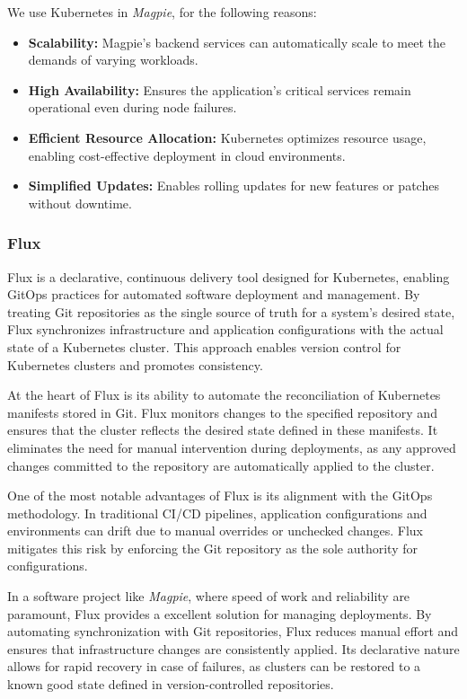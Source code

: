 \documentclass[preview]{standalone}
\begin{document}
We use Kubernetes in \textit{Magpie}, for the following reasons:
\begin{itemize}
    \item \textbf{Scalability:} Magpie's backend services can automatically
    scale to meet the demands of varying workloads.
    \item \textbf{High Availability:} Ensures the application's critical
    services remain operational even during node failures.
    \item \textbf{Efficient Resource Allocation:} Kubernetes optimizes resource
    usage, enabling cost-effective deployment in cloud environments.
    \item \textbf{Simplified Updates:} Enables rolling updates for new features
    or patches without downtime.
\end{itemize}

\subsubsection{Flux}

Flux is a declarative, continuous delivery tool designed for Kubernetes,
enabling GitOps practices for automated software deployment and management. By
treating Git repositories as the single source of truth for a system's desired
state, Flux synchronizes infrastructure and application configurations with the
actual state of a Kubernetes cluster. This approach enables version control
for Kubernetes clusters and promotes consistency.

At the heart of Flux is its ability to automate the reconciliation of Kubernetes
manifests stored in Git. Flux monitors changes to the specified repository and
ensures that the cluster reflects the desired state defined in these manifests.
It eliminates the need for manual intervention during deployments, as any
approved changes committed to the repository are automatically applied to the
cluster.

One of the most notable advantages of Flux is its alignment with the GitOps
methodology. In traditional CI/CD pipelines, application configurations and
environments can drift due to manual overrides or unchecked changes. Flux
mitigates this risk by enforcing the Git repository as the sole authority for
configurations.

In a software project like \textit{Magpie}, where speed of work and reliability
are paramount, Flux provides a excellent solution for managing deployments. By
automating synchronization with Git repositories, Flux reduces manual effort and
ensures that infrastructure changes are consistently applied. Its declarative
nature allows for rapid recovery in case of failures, as clusters can be
restored to a known good state defined in version-controlled repositories.
\end{document}
